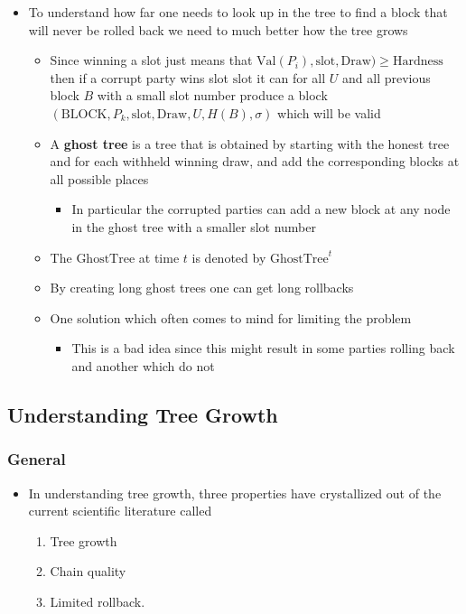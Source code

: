 \documentclass[11pt]{article}
\begin{document}
\begin{itemize}
\item To understand how far one needs to look up in the tree to find a block that will never be rolled back we need to much better how the tree grows
\begin{itemize}
\item Since winning a slot just means that \(\text{Val}(P_i),\text{slot}, \text{Draw}) \geq \text{Hardness}\) then if a corrupt party wins slot \(\text{slot}\) it can for all \(U\) and all previous block \(B\) with a small slot number produce a block \((\text{BLOCK}, P_k, \text{slot}, \text{Draw}, U, H(B), \sigma)\) which will be valid
\item A \textbf{ghost tree} is a tree that is obtained by starting with the honest tree and for each withheld winning draw, and add the corresponding blocks at all possible places
\begin{itemize}
\item In particular the corrupted parties can add a new block at any node in the ghost tree with a smaller slot number
\end{itemize}
\item The \(\text{GhostTree}\) at time \(t\) is denoted by \(\text{GhostTree}^t\)
\item By creating long ghost trees one can get long rollbacks
\item One solution which often comes to mind for limiting the problem
\begin{itemize}
\item This is a bad idea since this might result in some parties rolling back and another which do not
\end{itemize}
\end{itemize}
\end{itemize}

\subsection{Understanding Tree Growth}
\label{sec:org11ee34f}
\subsubsection{General}
\label{sec:org3c644c2}
\begin{itemize}
\item In understanding tree growth, three properties have crystallized out of the current scientific literature called
\begin{enumerate}
\item Tree growth
\item Chain quality
\item Limited rollback.
\end{enumerate}
\end{itemize}
\end{document}
